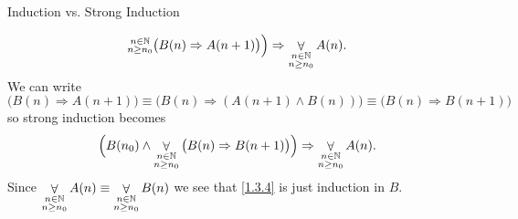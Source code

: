 \documentclass[smaller,hyperref={CJKbookmarks=true}]{beamer}
\newcommand{\N}{\mathbb{N}} \newcommand{\Z}{\mathbb{Z}} \newcommand{\Q}{\mathbb{Q}}
\begin{document}
\begin{frame}{Induction vs. Strong Induction}
\begin{spacing}{0.9}
\[{\begin{subarray}{c}
                                     n\in\N\\
                                     n\geq n_0
                                   \end{subarray}}\big(B(n)\Rightarrow A(n+1)\big)\Big)\Rightarrow\mathop{\forall}_{\begin{subarray}{c}
                                     n\in\N\\
                                     n\geq n_0
                                   \end{subarray}}A(n).\]
\vspace*{-4pt}
We can write
\[\big(B(n)\Rightarrow A(n+1)\big)\equiv\big(B(n)\Rightarrow(A(n+1)\wedge B(n))\big)\equiv\big(B(n)\Rightarrow B(n+1)\big)\]
so strong induction becomes
\begin{equation}\label{1.3.4}
  \Big(B(n_0)\wedge\mathop{\forall}_{\begin{subarray}{c}
                                     n\in\N\\
                                     n\geq n_0
                                   \end{subarray}}\big(B(n)\Rightarrow B(n+1)\big)\Big)\Rightarrow\mathop{\forall}_{\begin{subarray}{c}
                                     n\in\N\\
                                     n\geq n_0
                                   \end{subarray}}A(n).
\end{equation}
Since $\displaystyle\mathop{\forall}_{\begin{subarray}{c}
                                     n\in\N\\
                                     n\geq n_0
                                   \end{subarray}}A(n)\equiv\mathop{\forall}_{\begin{subarray}{c}
                                     n\in\N\\
                                     n\geq n_0
                                   \end{subarray}}B(n)$
we see that \eqref{1.3.4} is just induction in $B$.
\end{spacing}
\end{frame}
\end{document}
